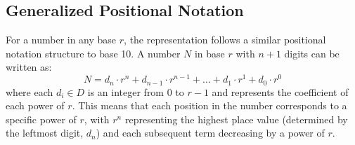 \subsection{Generalized Positional Notation}

For a number in any base \( r \), the representation follows a similar positional notation structure to base 10. A number \( N \) in base \( r \) with \( n+1 \) digits can be written as:
\[
N = d_n \cdot r^n + d_{n-1} \cdot r^{n-1} + \ldots + d_1 \cdot r^1 + d_0 \cdot r^0
\]
where each \( d_i \in D \) is an integer from \( 0 \) to \( r-1 \) and represents the coefficient of each power of \( r \). This means that each position in the number corresponds to a specific power of \( r \), with \( r^n \) representing the highest place value (determined by the leftmost digit, \( d_n \)) and each subsequent term decreasing by a power of \( r \).

